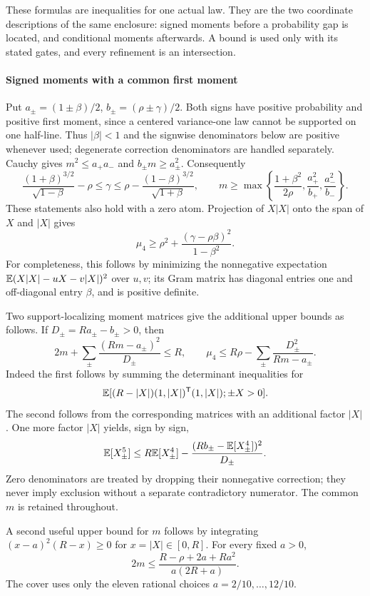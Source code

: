 These formulas are inequalities for one actual law. They are the two
coordinate descriptions of the same enclosure: signed moments before a
probability gap is located, and conditional moments afterwards. A bound
is used only with its stated gates, and every refinement is an intersection.
\paragraph{Signed moments with a common first moment}
Put $a_\pm=(1\pm\beta)/2$, $b_\pm=(\rho\pm\gamma)/2$.
Both signs have positive probability and positive first moment, since a
centered variance-one law cannot be supported on one half-line. Thus
$|\beta|<1$ and the signwise denominators below are positive whenever
used; degenerate correction denominators are handled separately.
Cauchy gives $m^2\le a_+a_-$ and $b_\pm m\ge a_\pm^2$.
Consequently
\[
 \frac{(1+\beta)^{3/2}}{\sqrt{1-\beta}}-\rho
 \le\gamma\le
 \rho-\frac{(1-\beta)^{3/2}}{\sqrt{1+\beta}},\qquad
 m\ge\max\left\{\frac{1+\beta^2}{2\rho},
                  \frac{a_+^2}{b_+},\frac{a_-^2}{b_-}\right\}.
\]
These statements also hold with a zero atom. Projection of $X|X|$ onto
the span of $X$ and $|X|$ gives
\[
 \mu_4\ge\rho^2+\frac{(\gamma-\rho\beta)^2}{1-\beta^2}.
\]
For completeness, this follows by minimizing the nonnegative expectation
$\mathbb E(X|X|-uX-v|X|)^2$ over $u,v$; its Gram matrix has diagonal entries
one and off-diagonal entry $\beta$, and is positive definite.

Two support-localizing moment matrices give the additional upper bounds
as follows. If
$D_\pm=Ra_\pm-b_\pm>0$, then
\[
 2m+\sum_\pm\frac{(Rm-a_\pm)^2}{D_\pm}\le R,
 \qquad
 \mu_4\le R\rho-\sum_\pm\frac{D_\pm^2}{Rm-a_\pm}.
\]
Indeed the first follows by summing the determinant inequalities for
\[\mathbb E[(R-|X|)(1,|X|)^{\mathsf T}(1,|X|);\pm X>0].\]
The second follows from the corresponding matrices with an additional
factor $|X|$. One more factor $|X|$ yields, sign by sign,
\[
 \mathbb E[X_\pm^5]\le R \mathbb E[X_\pm^4]
 -\frac{(Rb_\pm-\mathbb E[X_\pm^4])^2}{D_\pm}.
\]
Zero denominators are treated by dropping their nonnegative correction;
they never imply exclusion without a separate contradictory numerator.
The common $m$ is retained throughout.

A second useful upper bound for $m$ follows by integrating
$(x-a)^2(R-x)\ge0$ for $x=|X|\in[0,R]$. For every fixed $a>0$,
\[
 2m\le\frac{R-\rho+2a+Ra^2}{a(2R+a)}.
\]
The cover uses only the eleven rational choices $a=2/10,\ldots,12/10$.

